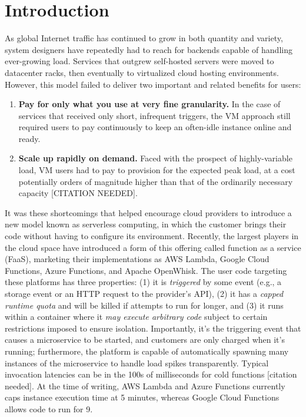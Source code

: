 \section{Introduction}
\label{sec:intro}

As global Internet traffic has continued to grow in both quantity and variety, system designers have repeatedly had to reach for backends capable of handling ever-growing load.
Services that outgrew self-hosted servers were moved to datacenter racks, then eventually to virtualized cloud hosting environments.
However, this model failed to deliver two important and related benefits for users:
\begin{enumerate}
\item \textbf{Pay for only what you use at very fine granularity.} In the case of services that received only short, infrequent triggers, the VM approach still required users to pay continuously to keep an often-idle instance online and ready.
\item \textbf{Scale up rapidly on demand.} Faced with the prospect of highly-variable load, VM users had to pay to provision for the expected peak load, at a cost potentially orders of magnitude higher than that of the ordinarily necessary capacity [CITATION NEEDED].
\end{enumerate}

It was these shortcomings that helped encourage cloud providers to introduce a new model known as serverless computing, in which the customer brings their code without having to configure its environment.
Recently, the largest players in the cloud space have introduced a form of this offering called function as a service (FaaS), marketing their implementations as AWS Lambda, Google Cloud Functions, Azure Functions, and Apache OpenWhisk.
The user code targeting these platforms has three properties: (1) it is \textit{triggered} by some event (e.g., a storage event or an HTTP request to the provider's API), (2) it has a \textit{capped runtime quota} and will be killed if attempts to run for longer, and (3) it runs within a container where it \textit{may execute arbitrary code} subject to certain restrictions imposed to ensure isolation.
Importantly, it's the triggering event that causes a microservice to be started, and customers are only charged when it's running; furthermore, the platform is capable of automatically spawning many instances of the microservice to handle load spikes transparently.
Typical invocation latencies can be in the 100s of milliseconds for cold functions [citation needed].
At the time of writing, AWS Lambda and Azure Functions currently caps instance execution time at 5 minutes, whereas Google Cloud Functions allows code to run for 9.

